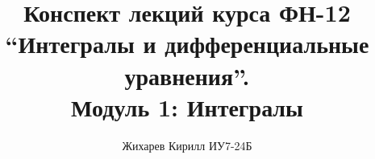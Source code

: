 \documentclass[a4paper]{article}
\title{Конспект лекций курса ФН-12 \\ ``Интегралы и дифференциальные уравнения''. \\ Модуль 1: Интегралы}
\author{Жихарев Кирилл ИУ7-24Б}
\date{ }
\begin{document}
  \maketitle
  \pagebreak

  \tableofcontents
  \pagebreak

  
  
\end{document}
